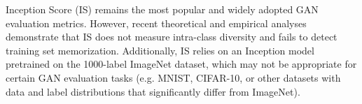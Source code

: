 
Inception Score (IS) \cite{gulrajani2017improved} remains the most popular and widely adopted GAN evaluation metrics.
However, recent theoretical and empirical analyses \cite{barratt2018note, borji2018pros, odena2016conditional} demonstrate that IS does not measure intra-class diversity and fails to detect training set memorization.
Additionally, IS relies on an Inception model pretrained on the 1000-label ImageNet dataset, which may not be appropriate for certain GAN evaluation tasks (e.g. MNIST, CIFAR-10, or other datasets with data and label distributions that significantly differ from ImageNet).
